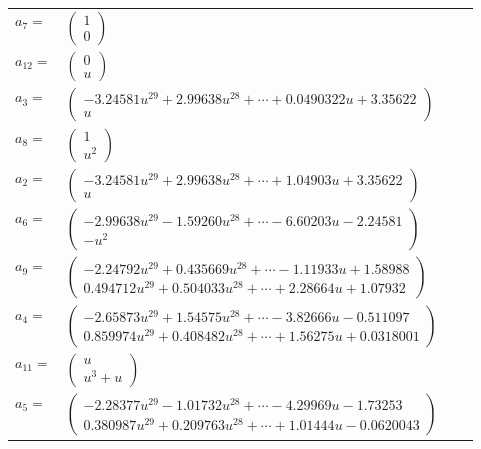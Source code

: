 \documentclass[1p]{elsarticle_modified}
\theoremstyle{definition}
\begin{document}
\begin{tabular}{m{7pt} m{180pt} m{7pt} m{180pt} }
\flushright $a_{7}=$&$\begin{pmatrix}1\\0\end{pmatrix}$ \\
\flushright $a_{12}=$&$\begin{pmatrix}0\\u\end{pmatrix}$ \\
\flushright $a_{3}=$&$\begin{pmatrix}-3.24581 u^{29}+2.99638 u^{28}+\cdots+0.0490322 u+3.35622\\u\end{pmatrix}$ \\
\flushright $a_{8}=$&$\begin{pmatrix}1\\u^2\end{pmatrix}$ \\
\flushright $a_{2}=$&$\begin{pmatrix}-3.24581 u^{29}+2.99638 u^{28}+\cdots+1.04903 u+3.35622\\u\end{pmatrix}$ \\
\flushright $a_{6}=$&$\begin{pmatrix}-2.99638 u^{29}-1.59260 u^{28}+\cdots-6.60203 u-2.24581\\- u^2\end{pmatrix}$ \\
\flushright $a_{9}=$&$\begin{pmatrix}-2.24792 u^{29}+0.435669 u^{28}+\cdots-1.11933 u+1.58988\\0.494712 u^{29}+0.504033 u^{28}+\cdots+2.28664 u+1.07932\end{pmatrix}$ \\
\flushright $a_{4}=$&$\begin{pmatrix}-2.65873 u^{29}+1.54575 u^{28}+\cdots-3.82666 u-0.511097\\0.859974 u^{29}+0.408482 u^{28}+\cdots+1.56275 u+0.0318001\end{pmatrix}$ \\
\flushright $a_{11}=$&$\begin{pmatrix}u\\u^3+u\end{pmatrix}$ \\
\flushright $a_{5}=$&$\begin{pmatrix}-2.28377 u^{29}-1.01732 u^{28}+\cdots-4.29969 u-1.73253\\0.380987 u^{29}+0.209763 u^{28}+\cdots+1.01444 u-0.0620043\end{pmatrix}$ \\

\end{tabular}
\end{document}
